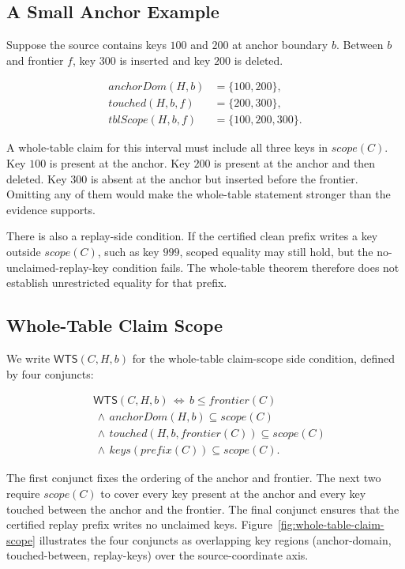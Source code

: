 \documentclass[letterpaper,10pt,twocolumn]{article}
\newcommand{\Scope}{\mathit{scope}}
\newcommand{\Frontier}{\mathit{frontier}}
\newcommand{\CleanPrefix}{\mathit{prefix}}
\newcommand{\AnchorDomain}{\mathit{anchorDom}}
\newcommand{\TouchedBetween}{\mathit{touched}}
\newcommand{\TableScopeBetween}{\mathit{tblScope}}
\newcommand{\ReplayKeys}{\mathit{keys}}
\newcommand{\WTS}{\mathsf{WTS}}
\begin{document}
\subsection{A Small Anchor Example}\label{a-small-anchor-example}

Suppose the source contains keys $100$ and $200$ at anchor
boundary $b$. Between $b$ and frontier $f$, key
$300$ is inserted and key $200$ is deleted.

\[
\begin{aligned}
\AnchorDomain(H,b)&=\{100,200\},\\
\TouchedBetween(H,b,f)&=\{200,300\},\\
\TableScopeBetween(H,b,f)&=\{100,200,300\}.
\end{aligned}
\]

A whole-table claim for this interval must include all three keys in
$\Scope(C)$. Key $100$ is present at the anchor. Key
$200$ is present at the anchor and then deleted. Key $300$
is absent at the anchor but inserted before the frontier. Omitting any
of them would make the whole-table statement stronger than the evidence
supports.

There is also a replay-side condition. If the certified clean prefix
writes a key outside $\Scope(C)$, such as key $999$, scoped equality
may still hold, but the no-unclaimed-replay-key condition fails. The
whole-table theorem therefore does not establish unrestricted equality
for that prefix.

\subsection{Whole-Table Claim Scope}\label{whole-table-claim-scope}

We write $\WTS(C,H,b)$ for the whole-table claim-scope side condition,
defined by four conjuncts:

\[
\begin{aligned}
&\WTS(C,H,b) \,\Longleftrightarrow\, b \le \Frontier(C)\\
&\,\land\, \AnchorDomain(H,b) \subseteq \Scope(C)\\
&\,\land\, \TouchedBetween(H,b,\Frontier(C)) \subseteq \Scope(C)\\
&\,\land\, \ReplayKeys(\CleanPrefix(C)) \subseteq \Scope(C).
\end{aligned}
\]

The first conjunct fixes the ordering of the anchor and frontier. The
next two require $\Scope(C)$ to cover every key present at the
anchor and every key touched between the anchor and the frontier. The
final conjunct ensures that the certified replay prefix writes no
unclaimed keys.
Figure~\ref{fig:whole-table-claim-scope} illustrates the four conjuncts as
overlapping key regions (anchor-domain, touched-between, replay-keys)
over the source-coordinate axis.
\end{document}
